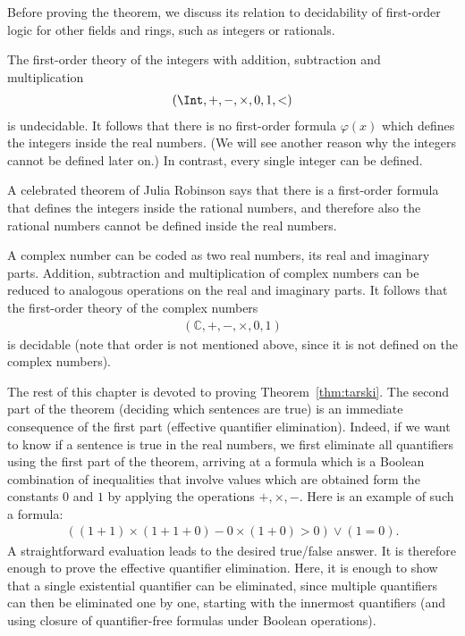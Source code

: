 Before proving the theorem, we discuss its relation to decidability of first-order logic for other fields and rings, such as integers or rationals.

\begin{example}
The  first-order theory of the integers with addition, subtraction and multiplication
\begin{align*}
(\Int, +, -, \times, 0, 1, <)
\end{align*}
is undecidable. It follows that there is no first-order formula $\varphi(x)$  which defines the integers inside the real numbers. (We will see another reason why the integers cannot be defined later on.) In contrast, every single integer can be defined.	

A celebrated theorem of Julia Robinson says that there is a first-order formula that defines the integers inside the rational numbers, and therefore also the rational numbers cannot be defined inside the real numbers.
\end{example}

\begin{example}
	A complex number can be coded as two real numbers, its real and imaginary parts. Addition, subtraction and multiplication of complex numbers can be reduced to analogous operations on the real and imaginary parts. It follows  that the first-order theory  of the complex numbers
	\begin{align*}
  (\mathbb C, +, -, \times, 0, 1)
\end{align*}
	is decidable (note that order is not mentioned above, since it is not defined on the complex numbers).
\end{example}

The rest of this chapter is devoted to proving Theorem~\ref{thm:tarski}. 
The second part of the theorem (deciding which  sentences are true) is an immediate consequence of the first part (effective quantifier elimination). Indeed, if we want to know if a sentence is true in the real numbers, we first eliminate all quantifiers using the first part of the theorem, arriving at a formula which is a Boolean combination of inequalities that involve values which are obtained form the constants $0$ and $1$ by applying the operations $+,\times,-$. Here is an example  of such a formula:
\begin{align*}
  ((1  +  1) \times (1 + 1 + 0) - 0 \times (1 + 0) >  0) \lor (1 = 0).
\end{align*}
A straightforward evaluation leads to the desired true/false answer.  It is therefore enough to prove the effective quantifier elimination. Here, it is enough to show that a single existential quantifier can be eliminated, since multiple quantifiers can then be eliminated one by one, starting with the innermost quantifiers (and using closure of quantifier-free formulas under Boolean operations). 

